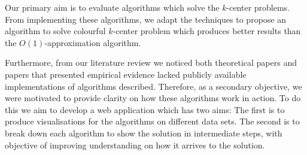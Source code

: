 Our primary aim is to evaluate algorithms which solve the $k$-center problems. From implementing these algorithms, we adapt the techniques to propose an algorithm to solve colourful $k$-center problem which produces better results than the $O(1)$-approximation algorithm. 

Furthermore, from our literature review we noticed both theoretical papers and papers that presented empirical evidence lacked publicly available implementations of algorithms described. Therefore, as a secondary objective, we were motivated to provide clarity on how these algorithms work in action. To do this we aim to develop a web application which has two aims: The first is to produce visualisations for the algorithms on different data sets. The second is to break down each algorithm to show the solution in intermediate steps, with objective of improving understanding on how it arrives to the solution.